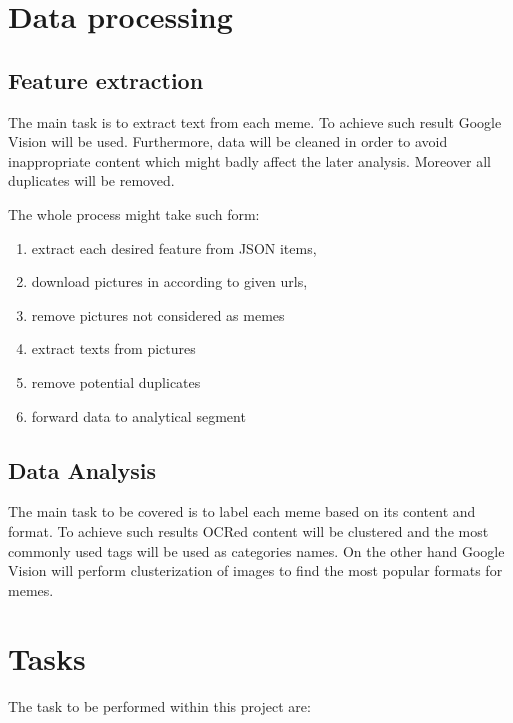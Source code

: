 \documentclass{article}
\begin{document}

\section{Data processing}
\subsection{Feature extraction}
The main task is to extract text from each meme. To achieve such result Google Vision will be used. Furthermore, data will be cleaned in order to avoid \linebreak inappropriate content which might badly affect the later analysis. Moreover all duplicates will be removed. 

The whole process might take such form:
\begin{enumerate}
    \item extract each desired feature from JSON items,
    \item download pictures in according to given urls,
    \item remove pictures not considered as memes
    \item extract texts from pictures
    \item remove potential duplicates
    \item forward data to analytical segment
    
\end{enumerate}

\subsection{Data Analysis}
The main task to be covered is to label each meme based on its content and format. To achieve such results OCRed content will be clustered and the most commonly used tags will be used as categories names. On the other hand Google Vision will perform clusterization of images to find the most popular formats for memes.



\section{Tasks}
The task to be performed within this project are:
\end{document}
